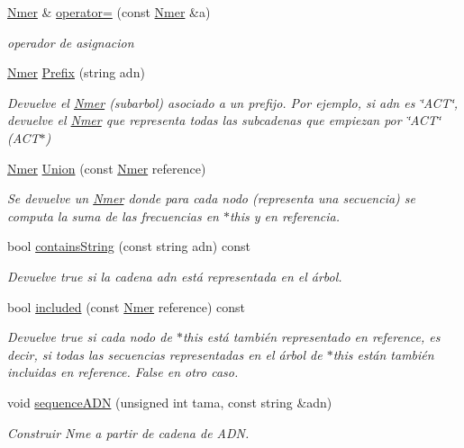 \begin{DoxyCompactItemize}
\hyperlink{classNmer}{Nmer} \& \hyperlink{classNmer_a129843cfe04a63a199ac641117c052cc}{operator=} (const \hyperlink{classNmer}{Nmer} \&a)
\begin{DoxyCompactList}\small\item\em operador de asignacion \end{DoxyCompactList}\item 
\hyperlink{classNmer}{Nmer} \hyperlink{classNmer_adf184ca659cf3ce3f2db301acae40e56}{Prefix} (string adn)
\begin{DoxyCompactList}\small\item\em Devuelve el \hyperlink{classNmer}{Nmer} (subarbol) asociado a un prefijo. Por ejemplo, si adn es \char`\"{}\+A\+C\+T\char`\"{}, devuelve el \hyperlink{classNmer}{Nmer} que representa todas las subcadenas que empiezan por \char`\"{}\+A\+C\+T\char`\"{} (A\+C\+T$\ast$) \end{DoxyCompactList}\item 
\hyperlink{classNmer}{Nmer} \hyperlink{classNmer_a3d0bac5611cb1648e5b626a7f7c8e987}{Union} (const \hyperlink{classNmer}{Nmer} reference)
\begin{DoxyCompactList}\small\item\em Se devuelve un \hyperlink{classNmer}{Nmer} donde para cada nodo (representa una secuencia) se computa la suma de las frecuencias en $\ast$this y en referencia. \end{DoxyCompactList}\item 
bool \hyperlink{classNmer_a3aa6c3d317ab01bd6b8c53434f50d03f}{contains\+String} (const string adn) const 
\begin{DoxyCompactList}\small\item\em Devuelve true si la cadena adn está representada en el árbol. \end{DoxyCompactList}\item 
bool \hyperlink{classNmer_ac5af1362b3f8ef4141574e62bc3510ac}{included} (const \hyperlink{classNmer}{Nmer} reference) const 
\begin{DoxyCompactList}\small\item\em Devuelve true si cada nodo de $\ast$this está también representado en reference, es decir, si todas las secuencias representadas en el árbol de $\ast$this están también incluidas en reference. False en otro caso. \end{DoxyCompactList}\item 
void \hyperlink{classNmer_a4c29aa3845d91b09f8e0bc3517ca4ec6}{sequence\+A\+DN} (unsigned int tama, const string \&adn)
\begin{DoxyCompactList}\small\item\em Construir Nme a partir de cadena de A\+DN. \end{DoxyCompactList}\item 

\end{DoxyCompactItemize}
